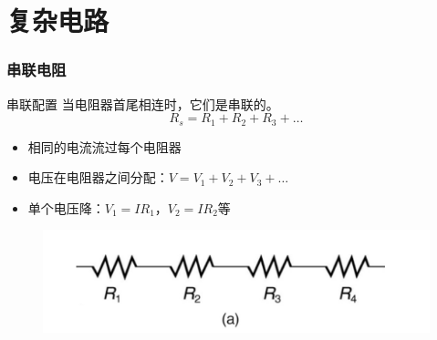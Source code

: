 \documentclass{beamer}
\begin{document}
\section{复杂电路}
\begin{frame}
    \frametitle{串联电阻}
    \begin{block}{串联配置}
        当电阻器首尾相连时，它们是串联的。
        \[ R_s = R_1 + R_2 + R_3 + \ldots \]
    \end{block}
    \begin{itemize}
        \item 相同的电流流过每个电阻器
        \item 电压在电阻器之间分配：$V = V_1 + V_2 + V_3 + \ldots$
        \item 单个电压降：$V_1 = IR_1$，$V_2 = IR_2$等
    \end{itemize}
    \begin{center}
        \begin{figure}
            \centering
            \includegraphics[width=0.75\linewidth]{serres.png}
        \end{figure}
    \end{center}
\end{frame}
\end{document}
